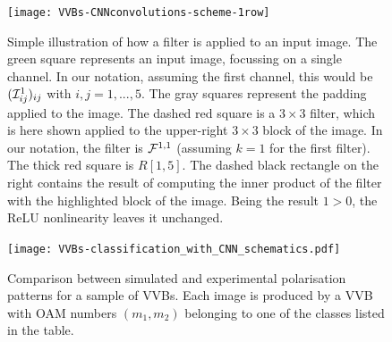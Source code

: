 \begin{figure}[tb]
    \centering
    \texttt{[image: VVBs-CNNconvolutions-scheme-1row]}
    \caption{
    	Simple illustration of how a filter is applied to an input image.
    	The green square represents an input image, focussing on a single channel. In our notation, assuming the first channel, this would be $({\mathcal{I}}^1_{ij})_{ij}$ with $i,j=1,...,5$.
    	The gray squares represent the padding applied to the image.
    	The dashed red square is a $3\times 3$ filter, which is here shown applied to the upper-right $3\times3$ block of the image.
    	In our notation, the filter is ${\mathcal{F}}^{1,1}$ (assuming $k=1$ for the first filter). The thick red square is $R[1,5]$. The dashed black rectangle on the right contains the result of computing the inner product of the filter with the highlighted block of the image.
    	Being the result $1>0$, the ReLU nonlinearity leaves it unchanged.
    }%
    \label{fig:VVBs:convolutions_example}
\end{figure}

\begin{figure}[t]
    \centering
    \texttt{[image: VVBs-classification\_with\_CNN\_schematics.pdf]}
    \caption{
    	Comparison between simulated and experimental polarisation patterns for a sample of \acp{VVB}. Each image is produced by a VVB with OAM numbers $(m_1, m_2)$ belonging to one of the classes listed in the table.
    }%
    \label{fig:VVBs:simVsExp}
\end{figure}

